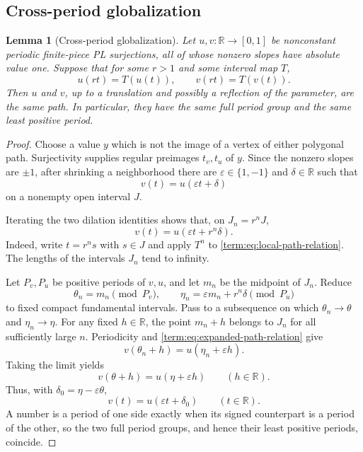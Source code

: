 \documentclass[11pt]{article}
\newtheorem{lemma}[theorem]{Lemma}
\theoremstyle{definition}
\theoremstyle{remark}
\newcommand{\I}{[0,1]}
\begin{document}
\subsection{Cross-period globalization}

\begin{lemma}[Cross-period globalization]\label{term:lem:cross-period}
Let \(u,v\colon\mathbb R\to\I\) be nonconstant periodic finite-piece PL
surjections, all of whose nonzero slopes have absolute value one.  Suppose
that for some \(r>1\) and some interval map \(T\),
\[
 u(rt)=T(u(t)),\qquad v(rt)=T(v(t)).
\]
Then \(u\) and \(v\), up to a translation and possibly a reflection of the
parameter, are the same path.  In particular, they have the same full period
group and the same least positive period.
\end{lemma}

\begin{proof}
Choose a value $y$ which is not the image of a vertex of either polygonal
path.  Surjectivity supplies regular preimages $t_v,t_u$ of $y$.  Since the
nonzero slopes are $\pm1$, after shrinking a neighborhood there are
$\varepsilon\in\{1,-1\}$ and $\delta\in\mathbb R$ such that
\begin{equation}\label{term:eq:local-path-relation}
 v(t)=u(\varepsilon t+\delta)
\end{equation}
on a nonempty open interval $J$.

Iterating the two dilation identities shows that, on $J_n=r^nJ$,
\begin{equation}\label{term:eq:expanded-path-relation}
 v(t)=u(\varepsilon t+r^n\delta).
\end{equation}
Indeed, write $t=r^ns$ with $s\in J$ and apply $T^n$ to
\eqref{term:eq:local-path-relation}.  The lengths of the intervals $J_n$
tend to infinity.

Let $P_v,P_u$ be positive periods of $v,u$, and let $m_n$ be the midpoint of
$J_n$.  Reduce
\[
 \theta_n=m_n\pmod {P_v},\qquad
 \eta_n=\varepsilon m_n+r^n\delta\pmod {P_u}
\]
to fixed compact fundamental intervals.  Pass to a subsequence on which
$\theta_n\to\theta$ and $\eta_n\to\eta$.  For any fixed
$h\in\mathbb R$, the point $m_n+h$ belongs to $J_n$ for all sufficiently
large $n$.  Periodicity and \eqref{term:eq:expanded-path-relation} give
\[
 v(\theta_n+h)=u(\eta_n+\varepsilon h).
\]
Taking the limit yields
\[
 v(\theta+h)=u(\eta+\varepsilon h)
 \qquad(h\in\mathbb R).
\]
Thus, with $\delta_0=\eta-\varepsilon\theta$,
\[
 v(t)=u(\varepsilon t+\delta_0)\qquad(t\in\mathbb R).
\]
A number is a period of one side exactly when its signed counterpart is a
period of the other, so the two full period groups, and hence their least
positive periods, coincide.
\end{proof}
\end{document}
